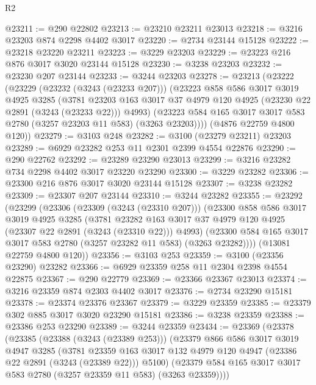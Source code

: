 \begin{lexlean}{R2}
\begin{coremodule}
@23211 := @290 @22802
@23213 := @23210 @23211 @23013
@23218 := @3216 @23203 @874 @2298 @4402 @3017
@23220 := @2734 @23144 @15128
@23222 := @23218 @23220 @23211
@23223 := @3229 @23203
@23229 := @23223 @216 @876 @3017 @3020 @23144 @15128
@23230 := @3238 @23203
@23232 := @23230 @207 @23144
@23233 := @3244 @23203
@23278 := @23213
    (@23222
      (@23229
        (@23232 (@3243 (@23233 @207)))
        (@23223
          @858
          @586
          @3017
          @3019
          @4925
          @3285
          (@3781
            @23203
            @163
            @3017
            @37
            @4979
            @120
            @4925
            (@23230 @22 @2891 (@3243 (@23233 @22)))
            @4993)
          (@23223 @584 @165 @3017 @3017 @583 @2780 (@3257 @23203 @11 @583) (@3263 @23203))))
      (@4876 @22759 @4800 @120))
@23279 := @3103 @248
@23282 := @3100 (@23279 @23211) @23203
@23289 := @6929 @23282 @253 @11 @2301 @2399 @4554 @22876
@23290 := @290 @22762
@23292 := @23289 @23290 @23013
@23299 := @3216 @23282 @734 @2298 @4402 @3017 @23220 @23290
@23300 := @3229 @23282
@23306 := @23300 @216 @876 @3017 @3020 @23144 @15128
@23307 := @3238 @23282
@23309 := @23307 @207 @23144
@23310 := @3244 @23282
@23355 := @23292
    (@23299
      (@23306
        (@23309 (@3243 (@23310 @207)))
        (@23300
          @858
          @586
          @3017
          @3019
          @4925
          @3285
          (@3781
            @23282
            @163
            @3017
            @37
            @4979
            @120
            @4925
            (@23307 @22 @2891 (@3243 (@23310 @22)))
            @4993)
          (@23300 @584 @165 @3017 @3017 @583 @2780 (@3257 @23282 @11 @583) (@3263 @23282))))
      (@13081 @22759 @4800 @120))
@23356 := @3103 @253
@23359 := @3100 (@23356 @23290) @23282
@23366 := @6929 @23359 @258 @11 @2304 @2398 @4554 @22875
@23367 := @290 @22779
@23369 := @23366 @23367 @23013
@23374 := @3216 @23359 @874 @2303 @4402 @3017
@23376 := @2734 @23290 @15181
@23378 := @23374 @23376 @23367
@23379 := @3229 @23359
@23385 := @23379 @302 @885 @3017 @3020 @23290 @15181
@23386 := @3238 @23359
@23388 := @23386 @253 @23290
@23389 := @3244 @23359
@23434 := @23369
    (@23378
      (@23385
        (@23388 (@3243 (@23389 @253)))
        (@23379
          @866
          @586
          @3017
          @3019
          @4947
          @3285
          (@3781
            @23359
            @163
            @3017
            @132
            @4979
            @120
            @4947
            (@23386 @22 @2891 (@3243 (@23389 @22)))
            @5100)
          (@23379 @584 @165 @3017 @3017 @583 @2780 (@3257 @23359 @11 @583) (@3263 @23359))))

\end{coremodule}
\end{lexlean}
